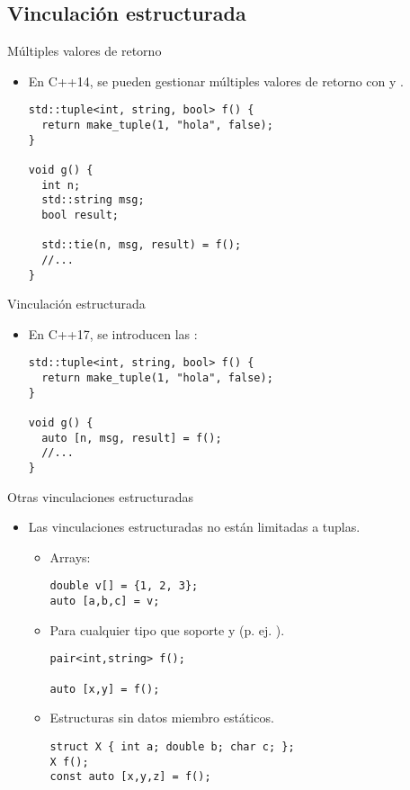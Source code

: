 \subsection{Vinculación estructurada}

\begin{frame}[t,fragile]{Múltiples valores de retorno}
\begin{itemize}
  \item En C++14, se pueden gestionar múltiples valores de retorno con
         y .
\begin{lstlisting}
std::tuple<int, string, bool> f() {
  return make_tuple(1, "hola", false);
}

void g() {
  int n;
  std::string msg;
  bool result;
 
  std::tie(n, msg, result) = f();
  //...
}
\end{lstlisting}
\end{itemize}
\end{frame}

\begin{frame}[t,fragile]{Vinculación estructurada}
\begin{itemize}
  \item En C++17, se introducen las :
\begin{lstlisting}
std::tuple<int, string, bool> f() {
  return make_tuple(1, "hola", false);
}

void g() {
  auto [n, msg, result] = f();
  //...
}
\end{lstlisting}
\end{itemize}
\end{frame}

\begin{frame}[t,fragile]{Otras vinculaciones estructuradas}
\begin{itemize}
  \item Las vinculaciones estructuradas no están limitadas a tuplas.
    \begin{itemize}
      \item Arrays:
\begin{lstlisting}
double v[] = {1, 2, 3};
auto [a,b,c] = v;
\end{lstlisting}

      \vfill\pause
      \item Para cualquier tipo que soporte  y 
            (p. ej. ).
\begin{lstlisting}
pair<int,string> f();

auto [x,y] = f();
\end{lstlisting}

      \vfill\pause
      \item Estructuras sin datos miembro estáticos.
\begin{lstlisting}
struct X { int a; double b; char c; };
X f();
const auto [x,y,z] = f();
\end{lstlisting}
    \end{itemize}
\end{itemize}
\end{frame}

